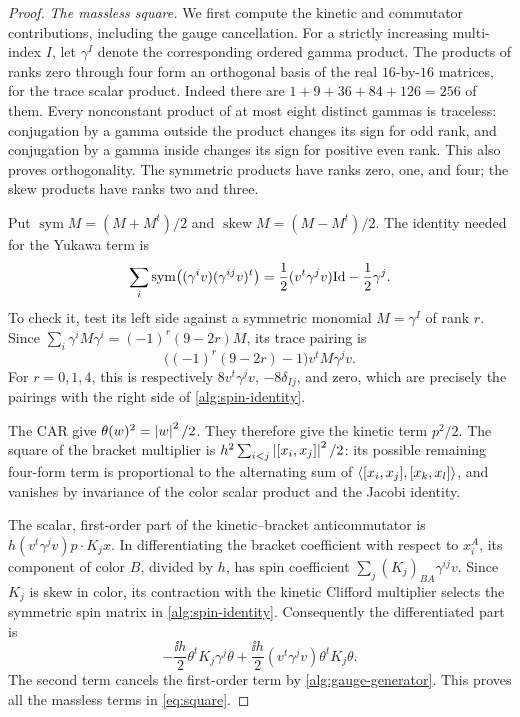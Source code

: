 \begin{proof}
\emph{The massless square.}
We first compute the kinetic and commutator contributions, including
the gauge cancellation. For a strictly increasing multi-index \(I\), let \(\gamma^I\) denote
the corresponding ordered gamma product. The products of ranks zero
through four form an orthogonal basis of the real \(16\)-by-\(16\)
matrices, for the trace scalar product. Indeed there are
\(1+9+36+84+126=256\) of them. Every nonconstant product of at most
eight distinct gammas is traceless: conjugation by a gamma outside the
product changes its sign for odd rank, and conjugation by a gamma
inside changes its sign for positive even rank. This also proves
orthogonality. The symmetric products have ranks zero, one, and four;
the skew products have ranks two and three.

Put \(\operatorname{sym}M=(M+M^t)/2\) and
\(\operatorname{skew}M=(M-M^t)/2\). The identity needed for the Yukawa
term is
\begin{equation}
\label{alg:spin-identity}
 \sum_i\operatorname{sym}\bigl((\gamma^iv)(\gamma^{ij}v)^t\bigr)
 =\frac12(v^t\gamma^jv)\mathrm{Id}-\frac12\gamma^j.
\end{equation}
To check it, test its left side against a symmetric monomial
\(M=\gamma^I\) of rank \(r\). Since
\(\sum_i\gamma^iM\gamma^i=(-1)^r(9-2r)M\), its trace pairing is
\[
 \bigl((-1)^r(9-2r)-1\bigr)v^tM\gamma^jv.
\]
For \(r=0,1,4\), this is respectively
\(8v^t\gamma^jv\), \(-8\delta_{Ij}\), and zero, which are precisely
the pairings with the right side of \eqref{alg:spin-identity}.

The CAR give \(\theta(w)^2=\left\lvert w\right\rvert^2/2\). They therefore give the
kinetic term \(p^2/2\). The square of the bracket multiplier is
\(h^2\sum_{i<j}\left\lvert [x_i,x_j]\right\rvert^2/2\): its possible remaining
four-form term is proportional to the alternating sum of
\(\left\langle [x_i,x_j],[x_k,x_l]\right\rangle\), and vanishes by invariance of the
color scalar product and the Jacobi identity.

The scalar, first-order part of the kinetic--bracket anticommutator is
\(h(v^t\gamma^jv)p\cdot K_jx\). In differentiating the bracket
coefficient with respect to \(x_i^A\), its component of color \(B\),
divided by \(h\), has spin coefficient
\(\sum_j(K_j)_{BA}\gamma^{ij}v\). Since \(K_j\) is skew in color,
its contraction with the kinetic Clifford multiplier selects the
symmetric spin matrix in \eqref{alg:spin-identity}. Consequently the
differentiated part is
\[
 -\frac{\ii h}{2}\theta^tK_j\gamma^j\theta
 +\frac{\ii h}{2}(v^t\gamma^jv)\theta^tK_j\theta.
\]
The second term cancels the first-order term by
\eqref{alg:gauge-generator}. This proves all the massless terms in
\eqref{eq:square}.


\end{proof}
